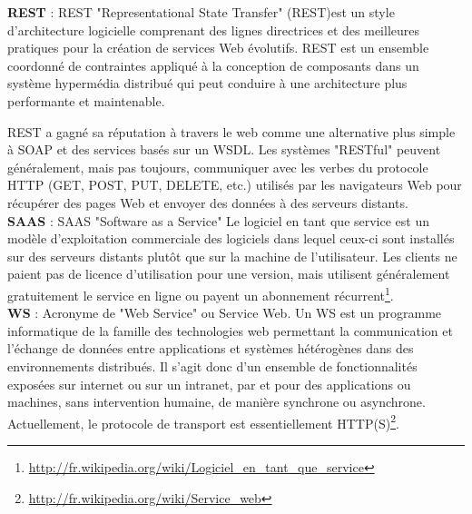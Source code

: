 \textbf{REST} : REST "Representational State Transfer" (REST) ​​est un style d'architecture logicielle comprenant des lignes directrices et des meilleures pratiques pour la création de services Web évolutifs. REST est un ensemble coordonné de contraintes appliqué à la conception de composants dans un système hypermédia distribué qui peut conduire à une architecture plus performante et maintenable.

REST a gagné sa réputation à travers le web comme une alternative plus simple à SOAP et des services basés sur un WSDL. Les systèmes "RESTful" peuvent généralement, mais pas toujours, communiquer avec les verbes du protocole HTTP (GET, POST, PUT, DELETE, etc.) utilisés par les navigateurs Web pour récupérer des pages Web et envoyer des données à des serveurs distants.\\


\textbf{SAAS} : SAAS "Software as a Service" Le logiciel en tant que service est un modèle d'exploitation commerciale des logiciels dans lequel ceux-ci sont installés sur des serveurs distants plutôt que sur la machine de l'utilisateur. Les clients ne paient pas de licence d'utilisation pour une version, mais utilisent généralement gratuitement le service en ligne ou payent un abonnement récurrent\footnote{\url{http://fr.wikipedia.org/wiki/Logiciel_en_tant_que_service}}.\\

\textbf{WS} : Acronyme de "Web Service" ou Service Web. Un WS est un programme informatique de la famille des technologies web permettant la communication et l'échange de données entre applications et systèmes hétérogènes dans des environnements distribués. Il s'agit donc d'un ensemble de fonctionnalités exposées sur internet ou sur un intranet, par et pour des applications ou machines, sans intervention humaine, de manière synchrone ou asynchrone. Actuellement, le protocole de transport est essentiellement HTTP(S)\footnote{\url{http://fr.wikipedia.org/wiki/Service_web}}. \\


